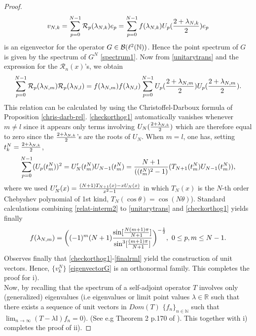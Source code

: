 \documentclass[a4paper,11pt,twoside]{article}
\numberwithin{equation}{section}
\newcommand\bbone{{ \mathbb{I}}}
\theoremstyle{nonumberplain}
\newtheorem{proof}{Proof}
\newcounter{and}
\begin{document}
\begin{proof}
\begin{equation}
v_{N,k}=\sum_{p=0}^{N-1}{\cal{R}}_{p}(\lambda_{N,k})e_p=\sum_{p=0}^{N-1}f(\lambda_{N,k})U_p({{2+\lambda_{N,k}}\over{2}})e_p\label{eigenvectorG}
\end{equation}
is an eigenvector for the operator $G\in{\cal{B}}(\ell^2(\mathbb{N}))$. Hence the point spectrum of $G$ is given by the spectrum of $G^N$ \eqref{spectrum1}. Now from \eqref{unitarytrans} and the expression for the $\mathcal{R}_n(x)$'s, we obtain 
\begin{equation}
\sum_{p=0}^{N-1}{\cal{R}}_p(\lambda_{N,m}){\cal{R}}_p(\lambda_{N,l})=f(\lambda_{N,m})f(\lambda_{N,l})\sum_{p=0}^{N-1}
U_p(\frac{2+\lambda_{N,m}}{2})U_p(\frac{2+\lambda_{N,m}}{2})\label{checkorthog1}.
\end{equation}
This relation can be calculated by using the Christoffel-Darboux formula of Proposition \ref{chris-darb-rel}. \eqref{checkorthog1} automatically vanishes whenever $m\ne l$ since it appears only terms involving $U_N({{2+\lambda_{N,k}}\over{2}})$ which are therefore equal to zero since the ${{2+\lambda_{N,k}}\over{2}}$'s are the roots of $U_N$. When $m=l$, one has, setting $t^N_k={{2+\lambda_{N,k}}\over{2}}$,
\begin{equation}
\sum_{p=0}^{N-1}(U_p(t^N_m))^2=U_N^\prime(t^N_m)U_{N-1}(t^N_m)={{N+1}\over{((t^N_m)^2-1)}}(T_{N+1}(t^N_m)U_{N-1}(t^N_m))\label{relat-interm2},
\end{equation}
where we used $U^\prime_N(x)={{(N+1)T_{N+1}(x)-xU_N(x) }\over{x^2-1 }}$ in which $T_N(x)$ is the $N$-th order Chebyshev polynomial of 1st kind, $T_N(\cos\theta)=\cos(N\theta)$). Standard calculations combining \eqref{relat-interm2} to \eqref{unitarytrans} and \eqref{checkorthog1} yields finally
\begin{equation}
f(\lambda_{N,m})=\bigg((-1)^m(N+1){{ \sin[{{N(m+1)\pi }\over{N+1 }}  ]}\over {\sin^3[{{(m+1)\pi }\over{N+1 }} ] }} \bigg)^{-{{1}\over{2}}},\ 0\le p,m\le N-1\label{finalrml}.
\end{equation}
Observes finally that \eqref{checkorthog1}-\eqref{finalrml} yield the construction of unit vectors. Hence, $\{v^N_k\}$ \eqref{eigenvectorG} is an orthonormal family. This completes the proof for i). \\
Now, by recalling that the spectrum of a self-adjoint operator $T$ involves only (generalized) eigenvalues (i.e eigenvalues or limit point values $\lambda\in\mathbb{R}$ such that there exists a sequence of unit vectors in $Dom(T)$ $\{f_n\}_{n\in\mathbb{N}}$ such that $\lim_{n\to\infty}(T-\lambda\bbone)f_n=0$). (See e.g Theorem 2 p.170 of \cite{helmberg}). This together with i) completes the proof of ii).
\end{proof}
\end{document}
